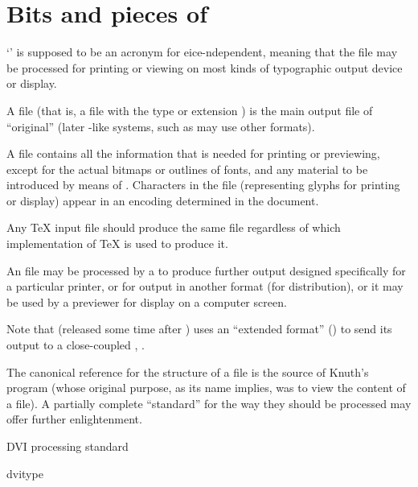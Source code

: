
\section{Bits and pieces of \AllTeX{}}


`' is supposed to be an acronym for
eice-ndependent, meaning that the file may be
processed for printing or viewing on most kinds of typographic output
device or display.

A  file (that is, a file with the type or extension
) is the main output file of ``original'' \tex{} (later
\tex{}-like systems, such as  may use
other formats).

A  file contains all the information that is needed for
printing or previewing, except for the actual bitmaps or outlines of
fonts, and any material to be introduced by means of %
.  Characters in the
 file (representing glyphs for printing or display) appear
in an encoding determined in the document.

Any \TeX{} input file should produce the same  file
regardless of which implementation of \TeX{} is used to produce it.

An  file may be processed by a 
to produce further output designed specifically for a particular
printer, or for output in another format (for distribution), or it may
be used by a previewer for display on a computer screen.

Note that  (released some time after
\pdftex{}) uses an ``extended  format'' () to send
its output to a close-coupled ,
.

The canonical reference for the structure of a  file is the
source of Knuth's program  (whose original purpose,
as its name implies, was to view the content of a  file).
A partially complete ``standard'' for the way they should be
processed may offer further enlightenment.
\begin{ctanrefs}
\item[\nothtml{rmfamily}DVI processing standard]
\item[dvitype]
\end{ctanrefs}

